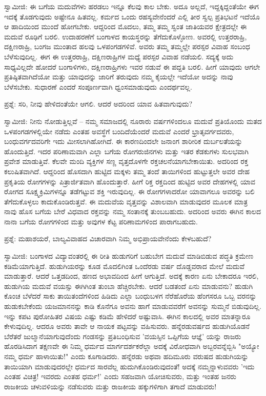 ಸ್ವಾಮೀಜಿ: ಈ ಬಗೆಯ ಮದುವೆಗಳು ಹರಡಲು ಇನ್ನೂ ಕೆಲವು ಕಾಲ ಬೇಕು. ಅದೂ ಅಲ್ಲದೆ, ಇದ್ದಕ್ಕಿದ್ದಂತೆಯೇ ಈಗ ಇದಕ್ಕೆ ತೊಡಗುವುದು ಅಷ್ಟೇನೂ ಹಿತವಲ್ಲ. ಕರ್ಮದ ಒಂದು ರಹಸ್ಯವೇನೆಂದರೆ ಎಲ್ಲಿ ತೀರ ಸ್ವಲ್ಪ ಪ್ರತಿಭಟನೆ ಇದೆಯೊ ಆ ಹಾದಿಯಿಂದ ಮುಂದೆ ಹೋಗಬೇಕು. ಆದ್ದರಿಂದ ಮೊದಲು, ತಮ್ಮ ತಮ್ಮ ಸ್ವಂತ ಜಾತಿಯವರ ಕ್ಷೇತ್ರದಲ್ಲೇ ಈ ಮದುವೆ ರೂಢಿಗೆ ಬರಲಿ. ಉದಾಹರಣೆಗೆ ಬಂಗಾಳದ ಕಾಯಸ್ಥರನ್ನು ತೆಗೆದುಕೊಳ್ಳೋಣ. ಅವರಲ್ಲಿ ಉತ್ತರರಾಹ್ರಿ, ದಕ್ಷಿಣರಾಹ್ರಿ, ಬಂಗಜ ಮುಂತಾದ ಹಲವು ಒಳಪಂಗಡಗಳಿವೆ. ಅವರು ತಮ್ಮ ತಮ್ಮಲ್ಲೇ ಪರಸ್ಪರ ವಿವಾಹ ಸಂಬಂಧ ಬೆಳೆಸುವುದಿಲ್ಲ. ಈಗ ಈ ಉತ್ತರರಾಹ್ರಿ, ದಕ್ಷಿಣರಾಹ್ರಿಗಳ ಮಧ್ಯೆ ಪರಸ್ಪರ ವಿವಾಹ ನಡೆಯಲಿ. ಸದ್ಯಕ್ಕೆ ಅದು ಸಾಧ್ಯವಿಲ್ಲದೇ ಹೋದರೆ ಬಂಗಾಳಿಗಳು, ದಕ್ಷಿಣರಾಹ್ರಿಗಳು ಇವರ ನಡುವೆ ಈ ಪದ್ದತಿ ಬರಲಿ. ಹೀಗೆ ಯಾವುದು ಆಗಲೇ ಪ್ರತಿಷ್ಠಿತವಾಗಿದೆಯೋ ಮತ್ತು ಯಾವುದನ್ನು ಜಾರಿಗೆ ತರುವುದು ನಮ್ಮ ಕೈಯಲ್ಲೇ ಇದೆಯೋ ಅದನ್ನು ನಾವು ಬೆಳೆಸಬೇಕು. ಸುಧಾರಣೆ ಎಂದರೆ ಸಂಪೂರ್ಣವಾಗಿ ಧ್ವಂಸಮಾಡುವುದು ಎಂದರ್ಥವಲ್ಲ.

ಪ್ರಶ್ನೆ: ಸರಿ, ನೀವು ಹೇಳಿದಂತೆಯೇ ಆಗಲಿ. ಆದರೆ ಅದರಿಂದ ಯಾವ ಹಿತವಾಗುವುದು?

ಸ್ವಾಮೀಜಿ: ನೀನು ನೋಡುತ್ತಿಲ್ಲವೆ – ನಮ್ಮ ಸಮಾಜದಲ್ಲಿ ನೂರಾರು ವರ್ಷಗಳಿಂದಲೂ ಮದುವೆ ಪ್ರತಿಯೊಂದು ಮತದ ಒಳಪಂಗಡಗಳಲ್ಲಿಯೇ ನಡೆದು ಎಂತಹ ಅವಸ್ಥೆಗೆ ಬಂದಿದೆಯೆಂದರೆ ಮದುವೆ ಎಂದರೆ ಭ್ರಾತೃವರ್ಗದವರು, ಬಂಧುವರ್ಗದವರಿಗೇ ಇದು ಮೀಸಲಾಗಿಹೋಗಿದೆ. ಈ ಕಾರಣದಿಂದಲೇ ಜನಾಂಗ ಶಾರೀರಿಕ ದುರ್ಬಲತೆಯನ್ನು ಹೊಂದುತ್ತಿದೆ. ಇದರ ಪರಿಣಾಮವಾಗಿ ಎಲ್ಲಾ ಬಗೆಯ ರೋಗರುಜಿನಗಳು ಮತ್ತು ಇತರ ಕೆಡಕುಗಳು ಸುಲಭವಾಗಿ ಪ್ರವೇಶ ಮಾಡುತ್ತಿವೆ. ಕೆಲವೇ ಮಂದಿ ವ್ಯಕ್ತಿಗಳ ಸಣ್ಣ ವೃತ್ತದೊಳಗೇ ರಕ್ತಚಲನೆಯಾಗಬೇಕಾಯಿತು. ಅದರಿಂದ ರಕ್ತ ಕಲುಷಿತವಾಗಿದೆ. ಆದ್ದರಿಂದ ಹೊಸದಾಗಿ ಹುಟ್ಟಿದ ಮಕ್ಕಳು ತಮ್ಮ ತಂದೆ ತಾಯಿಗಳಿಂದ ಹುಟ್ಟುತ್ತಲೇ ಅವರ ದೇಹ ಪ್ರಕೃತಿಯ ರೋಗಗಳನ್ನು ಪಿತ್ರಾರ್ಜಿತವಾಗಿ ಹೊಂದುತ್ತಾರೆ. ಹೀಗೆ ರಿಕ್ತ ರಕ್ತದಿಂದ ಹುಟ್ಟಿದ ಅವರ ದೇಹಗಳಲ್ಲಿ ಯಾವ ರೋಗದ ಸೂಕ್ಷ್ಮಕ್ರಿಮಿಗಳನ್ನೂ ತಡೆಗಟ್ಟುವ ಶಕ್ತಿ ಇರುವುದಿಲ್ಲ. ಈ ರೋಗಗಳಾದರೋ ಯಾವಾಗಲೂ ಅವರನ್ನು ಬಲಿ ತೆಗೆದುಕೊಳ್ಳಲು ಕಾದುಕೊಂಡಿರುತ್ತವೆ. ಈ ಮದುವೆಯ ವೃತ್ತವನ್ನು ವಿಶಾಲವಾಗಿ ಮಾಡುವುದರ ಮೂಲಕ ಮಾತ್ರ ನಾವು ಹೊಸ ಬಗೆಯ ಬೇರೆ ವಿಧವಾದ ರಕ್ತವನ್ನು ನಮ್ಮ ಸಂತಾನಕ್ಕೆ ತುಂಬಬಹುದು. ಅದರಿಂದ ಅವರು ಈಗಿನ ಕಾಲದ ನಾನಾ ಬಗೆಯ ರೋಗಗಳಿಂದ ಮತ್ತು ಅವುಗಳ ಕೆಟ್ಟ ಪರಿಣಾಮಗಳಿಂದ ಪಾರಾಗಬಹುದು.

ಪ್ರಶ್ನೆ: ಮಹಾಶಯರೆ, ಬಾಲ್ಯವಿವಾಹದ ವಿಚಾರವಾಗಿ ನಿಮ್ಮ ಅಭಿಪ್ರಾಯವೇನೆಂದು ಕೇಳಬಹುದೆ?

ಸ್ವಾಮೀಜಿ: ಬಂಗಾಳದ ವಿದ್ಯಾವಂತರಲ್ಲಿ ಈ ರೀತಿ ಹುಡುಗರಿಗೆ ಬಹುಬೇಗ ಮದುವೆ ಮಾಡಿಬಿಡುವ ಪದ್ಧತಿ ಕ್ರಮೇಣ ಕಡಿಮೆಯಾಗುತ್ತಿದೆ. ಹುಡುಗಿಯರನ್ನು ಕೂಡ ಮೊದಲಿಗಿಂತ ಒಂದೆರಡು ವರ್ಷ ದೊಡ್ಡವರಾದ ಮೇಲೆ ಮದುವೆ ಮಾಡುತ್ತಾರೆ. ಆದರೆ ಒತ್ತಡದಿಂದ, ಹಣದ ಅಭಾವದಿಂದ ಹೀಗೆ ಆಗುತ್ತಿದೆ. ಅದಕ್ಕೆ ಕಾರಣ ಏನು ಬೇಕಾದರೂ ಇರಲಿ, ಹುಡುಗಿಯ ಮದುವೆ ವಯಸ್ಸು ಈಗಿಗಿಂತ ತುಂಬಾ ಹೆಚ್ಚಿರಬೇಕು. ಆದರೆ ಬಡತಂದೆ ಏನು ಮಾಡುವನು? ಹುಡುಗಿ ಕೊಂಚ ಬೆಳೆದರೆ ಸಾಕು ತಾಯಿತಂದೆಗಳಿಂದ ಹಿಡಿದು ಎಲ್ಲಾ ಬಂಧುಬಳಗ ನೆರೆಹೊರೆಯ ಹೆಂಗಸರೂ ಒಬ್ಬ ವರನನ್ನು ಹುಡುಕಬೇಕೆಂದು ಯಜಮಾನನನ್ನು ಕಾಡಿ ಕೊನೆಗೂ ಅವನು ಹಾಗೆ ಮಾಡುವವರೆಗೆ ಅವನನ್ನು ಸುಮ್ಮನೆ ಬಿಡುವುದಿಲ್ಲ. ಇನ್ನು ಕಪಟ ಪುರೋಹಿತರ ವಿಷಯ ಎಷ್ಟು ಕಡಿಮೆ ಹೇಳಿದರೆ ಅಷ್ಟುವಾಸಿ. ಈಗಿನ ಕಾಲದಲ್ಲಿ ಅವರ ಮಾತನ್ನಾರೂ ಕೇಳುವುದಿಲ್ಲ. ಆದರೂ ಅವರು ತಾವೇ ಆ ನಾಯಕ ಪಟ್ಟವನ್ನು ವಹಿಸುವರು. ಹನ್ನೆರಡುವರ್ಷದ ಹುಡುಗಿಯೊಡನೆ ಬೆರೆತರೆ ಜುಲ್ಮಾನೆಯಾಗುವುದೆಂದು ಗಂಡಸನ್ನು ಪ್ರತಿಬಂಧಿಸುವ 'ವಯಸ್ಸಿನ ಒಪ್ಪಿಗೆಯ ಆಜ್ಞೆ'  ಯನ್ನು ರಾಜರು ಹೊರಡಿಸಿದಾಗ ತಕ್ಷಣವೇ ಈ ನಿಮ್ಮ ಧರ್ಮದ ಮಾರ್ಗದರ್ಶಕರೆಲ್ಲಾ ಅದಕ್ಕೆ ವಿರೋಧವಾಗಿ ಅಬ್ಬರವನ್ನೆಬ್ಬಿಸಿ "ಅಯ್ಯೋ ನಮ್ಮ ಧರ್ಮ ಹಾಳಾಯಿತು!" ಎಂದು ಕೂಗಾಡಿದರು. ಹನ್ನೆರಡು ಅಥವಾ ಹದಿಮೂರು ವರುಷದ ಹುಡುಗಿಯನ್ನು ತಾಯಿಯಾಗಿ ಮಾಡುವುದರಲ್ಲೇ ಧರ್ಮದ ಸಾರವೆಲ್ಲ ಹುದುಗಿಕೊಂಡಿರುವುದಂತೆ! ಅದಕ್ಕೆ ನಮ್ಮನ್ನಾಳುವವರು 'ಇದು ಎಂತಹ ವಿಚಿತ್ರ! ಇವರದು ಎಂತಹ ಧರ್ಮ!' ಎಂದು ಸಹಜವಾಗಿ ಯೋಚಿಸುವರು, ಮತ್ತು ಇಂತಹ ಜನರು ರಾಜಕೀಯ ಚಳುವಳಿಯನ್ನು ನಡೆಸುವರು ಮತ್ತು ರಾಜಕೀಯ ಹಕ್ಕುಗಳಿಗಾಗಿ ತಗಾದೆ ಮಾಡುವರು!


